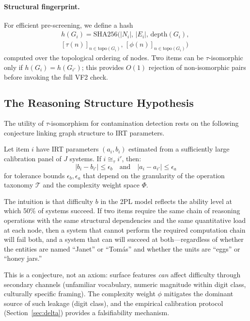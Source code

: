\paragraph{Structural fingerprint.}
For efficient pre-screening, we define a hash
\begin{multline}
  h(G_i) = \text{SHA256}\bigl(|N_i|,\, |E_i|,\,
  \text{depth}(G_i),\, \\
  [\tau(n)]_{n \in \text{topo}(G_i)},\,
  [\phi(n)]_{n \in \text{topo}(G_i)}\bigr)
\end{multline}
computed over the topological ordering of nodes. Two items can be
$\tau$-isomorphic only if
$h(G_i) = h(G_{i'})$; this provides $O(1)$ rejection of non-isomorphic
pairs before invoking the full VF2 check.


\subsection{The Reasoning Structure Hypothesis}
\label{sec:hypothesis}

The utility of $\tau$-isomorphism for contamination detection rests on
the following conjecture linking graph structure to IRT parameters.

\begin{conjecture}
\label{conj:rsh}
Let item $i$ have IRT parameters $(a_i, b_i)$ estimated from a
sufficiently large calibration panel of $J$ systems. If
$i \cong_\tau i'$, then:
\begin{equation}
|b_i - b_{i'}| \leq \epsilon_b
\quad \text{and} \quad
|a_i - a_{i'}| \leq \epsilon_a
\label{eq:rsh}
\end{equation}
for tolerance bounds $\epsilon_b, \epsilon_a$ that depend on the
granularity of the operation taxonomy $\mathcal{T}$ and the complexity
weight space $\Phi$.
\end{conjecture}

\noindent
The intuition is that difficulty $b$ in the 2PL model reflects the
ability level at which 50\% of systems succeed. If two items require
the same chain of reasoning operations with the same structural
dependencies and the same quantitative load at each node, then a system
that cannot perform the required computation chain will fail both, and a
system that can will succeed at both---regardless of whether the
entities are named ``Janet'' or ``Tom\'{a}s'' and whether the units are
``eggs'' or ``honey jars.''

This is a conjecture, not an axiom: surface features \emph{can} affect
difficulty through secondary channels (unfamiliar vocabulary, numeric
magnitude within digit class, culturally specific framing). The
complexity weight $\phi$ mitigates the dominant source of such leakage
(digit class), and the empirical calibration protocol
(Section~\ref{sec:delta}) provides a falsifiability mechanism.



